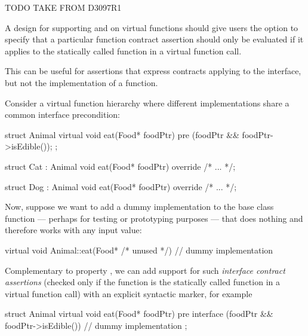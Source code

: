 
TODO TAKE FROM D3097R1


A design for supporting  and  on virtual functions should give users the option to specify that a particular function contract assertion should only be evaluated if it applies to the statically called function in a virtual function call.

This can be useful for assertions that express contracts applying to the interface, but not the implementation of a function.

Consider a virtual function hierarchy where different implementations share a common interface
precondition:

\begin{codeblock}
struct Animal {
  virtual void eat(Food* foodPtr)
    pre (foodPtr && foodPtr->isEdible());
};

struct Cat : Animal {
  void eat(Food* foodPtr) override
    /* ... */;
}

struct Dog : Animal {
  void eat(Food* foodPtr) override
    /* ... */;
}
\end{codeblock}

Now, suppose we want to add a dummy implementation to the base class function  --- perhaps for testing or prototyping purposes --- that does nothing and therefore works with any input value:

\begin{codeblock}
virtual void Animal::eat(Food* /* unused */) {
  // dummy implementation
}
\end{codeblock}

Complementary to property , we can add support for such \emph{interface contract assertions} (checked only if the function is the statically called function in a virtual function call) with an explicit syntactic marker, for example

\begin{codeblock}
struct Animal {
  virtual void eat(Food* foodPtr)
    pre interface (foodPtr && foodPtr->isEdible()) {
      // dummy implementation
    }
};
\end{codeblock}

